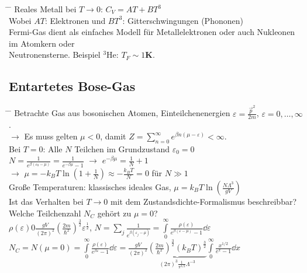 \begin{tabbing}
\hspace{4em} \= \hspace{4em} \= \kill
Reales Metall bei $T\to 0$: $C_V = A T + B T^3$\\
Wobei $A T$: Elektronen und $B T^3$: Gitterschwingungen (Phononen)\\
Fermi-Gas dient als einfaches Modell für Metallelektronen oder auch Nukleonen im Atomkern oder\\
Neutronensterne. Beispiel $^3$He: $T_F \sim 1\textbf{K}$.
\end{tabbing}


\subsection{Entartetes Bose-Gas}
\begin{tabbing}
\hspace{4em} \= \hspace{4em} \= \kill
Betrachte Gas aus bosonischen Atomen, Einteilchenenergien $\varepsilon = \frac{\vec{p}^2}{2 m}$, $\varepsilon = 0, \dots, \infty$.\\
$\rightarrow$\> Es muss gelten $\mu < 0$, damit $Z = \sum\limits_{n = 0}^{\infty} e^{\beta n(\mu - \varepsilon)} < \infty$.\\
Bei $T = 0$: Alle $N$ Teilchen im Grundzustand $\varepsilon_0 = 0$\\
\> $N = \frac{1}{e^{\beta (\varepsilon_0 - \mu)}} = \frac{1}{e^{-\beta\mu} - 1}$ $\rightarrow$ $e^{-\beta \mu} = \frac{1}{N} +1$\\
$\rightarrow$\> $\mu = - k_B  T \ln\left(1 + \frac{1}{N}\right) \approx -\frac{k_B T}{N} = 0$ für $N \gg 1$\\
Große Temperaturen: klassisches ideales Gas, $\mu = k_B T \ln\left(\frac{N \Lambda^3}{g V}\right)$\\
Ist das Verhalten bei $T\to 0$ mit dem Zustandsdichte-Formalismus beschreibbar?\\ Welche Teilchenzahl $N_C$ gehört zu $\mu = 0$?\\
$\rho(\varepsilon) 0 \frac{g V}{(2\pi)^2} \left(\frac{2 m}{\hbar^2}\right)^{\frac{3}{2}}\varepsilon^{\frac{1}{2}}$, $N = \sum\limits_j \frac{1}{e^{\beta (\varepsilon_j -\mu)}} = \int\limits_0^{\infty}\frac{\rho(\varepsilon)}{e^{\beta(\varepsilon - \mu)}- 1 }\dd{\varepsilon}$\\
$N_C = N(\mu = 0) = \int\limits_0^{\infty} \frac{\rho(\varepsilon)}{e^{\beta\varepsilon}-1}\dd{\varepsilon} = \frac{g V}{(2\pi)^2} \underbrace{\left(\frac{2 m}{\hbar^2}\right)^{\frac{3}{2}} (k_B T)^{\frac{3}{2}}}_{(2\pi)^3\frac{1}{\pi^{3/2}}\Lambda^{-3}} \int\limits_0^{\infty} \frac{x^{1/2}}{e^x - 1}\dd{x}$\\

\end{tabbing}
